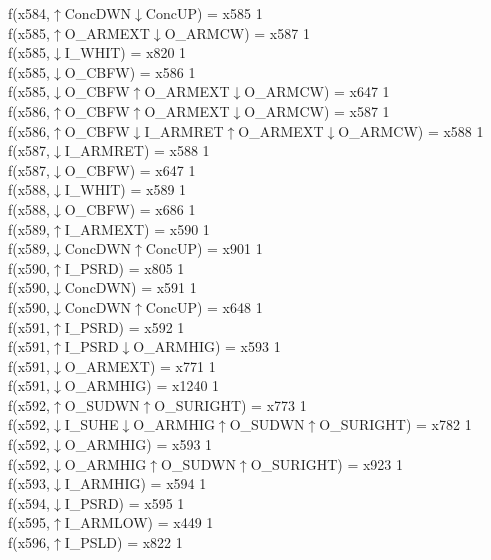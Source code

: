 f(x584,$\uparrow$ConcDWN$\downarrow$ConcUP) = x585 {1} \\
f(x585,$\uparrow$O\_ARMEXT$\downarrow$O\_ARMCW) = x587 {1} \\
f(x585,$\downarrow$I\_WHIT) = x820 {1} \\
f(x585,$\downarrow$O\_CBFW) = x586 {1} \\
f(x585,$\downarrow$O\_CBFW$\uparrow$O\_ARMEXT$\downarrow$O\_ARMCW) = x647 {1} \\
f(x586,$\uparrow$O\_CBFW$\uparrow$O\_ARMEXT$\downarrow$O\_ARMCW) = x587 {1} \\
f(x586,$\uparrow$O\_CBFW$\downarrow$I\_ARMRET$\uparrow$O\_ARMEXT$\downarrow$O\_ARMCW) = x588 {1} \\
f(x587,$\downarrow$I\_ARMRET) = x588 {1} \\
f(x587,$\downarrow$O\_CBFW) = x647 {1} \\
f(x588,$\downarrow$I\_WHIT) = x589 {1} \\
f(x588,$\downarrow$O\_CBFW) = x686 {1} \\
f(x589,$\uparrow$I\_ARMEXT) = x590 {1} \\
f(x589,$\downarrow$ConcDWN$\uparrow$ConcUP) = x901 {1} \\
f(x590,$\uparrow$I\_PSRD) = x805 {1} \\
f(x590,$\downarrow$ConcDWN) = x591 {1} \\
f(x590,$\downarrow$ConcDWN$\uparrow$ConcUP) = x648 {1} \\
f(x591,$\uparrow$I\_PSRD) = x592 {1} \\
f(x591,$\uparrow$I\_PSRD$\downarrow$O\_ARMHIG) = x593 {1} \\
f(x591,$\downarrow$O\_ARMEXT) = x771 {1} \\
f(x591,$\downarrow$O\_ARMHIG) = x1240 {1} \\
f(x592,$\uparrow$O\_SUDWN$\uparrow$O\_SURIGHT) = x773 {1} \\
f(x592,$\downarrow$I\_SUHE$\downarrow$O\_ARMHIG$\uparrow$O\_SUDWN$\uparrow$O\_SURIGHT) = x782 {1} \\
f(x592,$\downarrow$O\_ARMHIG) = x593 {1} \\
f(x592,$\downarrow$O\_ARMHIG$\uparrow$O\_SUDWN$\uparrow$O\_SURIGHT) = x923 {1} \\
f(x593,$\downarrow$I\_ARMHIG) = x594 {1} \\
f(x594,$\downarrow$I\_PSRD) = x595 {1} \\
f(x595,$\uparrow$I\_ARMLOW) = x449 {1} \\
f(x596,$\uparrow$I\_PSLD) = x822 {1} \\
